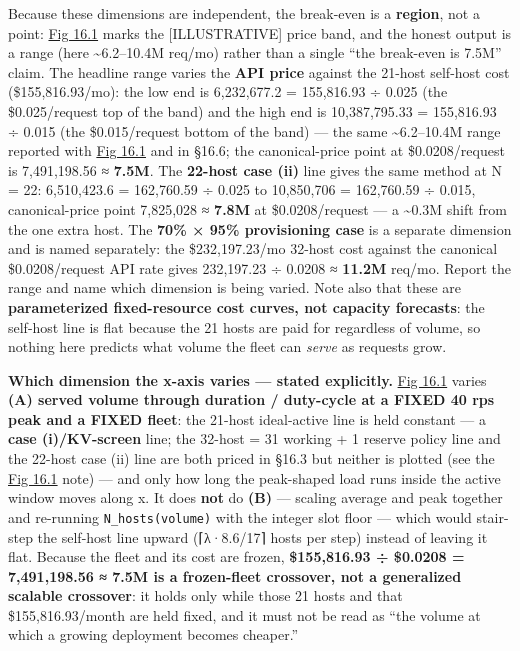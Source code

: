 Because these dimensions are independent, the break-even is a
\textbf{region}, not a point: \hyperref[fig:16.1]{Fig 16.1} marks the \mbox{{[}ILLUSTRATIVE{]}}
price band, and the honest output is a range (here
\textasciitilde6.2--10.4M req/mo) rather than a single ``the break-even
is 7.5M'' claim. The headline range varies the \textbf{API price}
against the 21-host self-host cost (\$155,816.93/mo): the low end is
6,232,677.2 = 155,816.93 ÷ 0.025 (the \$0.025/request top of the band)
and the high end is 10,387,795.33 = 155,816.93 ÷ 0.015 (the
\$0.015/request bottom of the band) --- the same
\textasciitilde6.2--10.4M range reported with \hyperref[fig:16.1]{Fig 16.1} and in §16.6; the
canonical-price point at \$0.0208/request is 7,491,198.56 ≈
\textbf{7.5M}. The \textbf{22-host case (ii)} line gives the same method
at N = 22: 6,510,423.6 = 162,760.59 ÷ 0.025 to 10,850,706 = 162,760.59 ÷
0.015, canonical-price point 7,825,028 ≈ \textbf{7.8M} at
\$0.0208/request --- a \textasciitilde0.3M shift from the one extra
host. The \textbf{70\% × 95\% provisioning case} is a separate dimension
and is named separately: the \$232,197.23/mo 32-host cost against the
canonical \$0.0208/request API rate gives 232,197.23 ÷ 0.0208 ≈
\textbf{11.2M} req/mo. Report the range and name which dimension is
being varied. Note also that these are \textbf{parameterized
fixed-resource cost curves, not capacity forecasts}: the self-host line
is flat because the 21 hosts are paid for regardless of volume, so
nothing here predicts what volume the fleet can \emph{serve} as requests
grow.

\textbf{Which dimension the x-axis varies --- stated explicitly.} \hyperref[fig:16.1]{Fig 16.1} varies \textbf{(A) served volume through duration / duty-cycle at a
FIXED 40 rps peak and a FIXED fleet}: the 21-host ideal-active line is
held constant --- a \textbf{case (i)/KV-screen} line; the 32-host = 31
working + 1 reserve policy line and the 22-host case (ii) line are both
priced in §16.3 but neither is plotted (see the \hyperref[fig:16.1]{Fig 16.1} note) --- and
only how long the peak-shaped load runs inside the active window moves
along x. It does \textbf{not} do \textbf{(B)} --- scaling average and
peak together and re-running \texttt{N\_hosts(volume)} with the integer
slot floor --- which would stair-step the self-host line upward
(⌈λ·8.6/17⌉ hosts per step) instead of leaving it flat. Because the
fleet and its cost are frozen, \textbf{\$155,816.93 ÷ \$0.0208 =
7,491,198.56 ≈ 7.5M is a frozen-fleet crossover, not a generalized
scalable crossover}: it holds only while those 21 hosts and that
\$155,816.93/month are held fixed, and it must not be read as ``the
volume at which a growing deployment becomes cheaper.''

